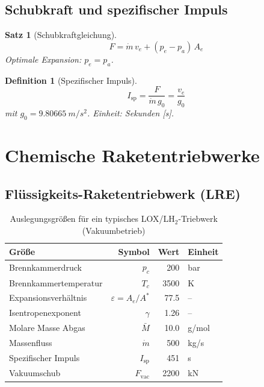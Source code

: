 ﻿\documentclass[12pt,a4paper]{article}
\newtheorem{satz}{Satz}[section]
\newtheorem{definition}{Definition}[section]
\newcommand{\Isp}{I_{\mathrm{sp}}}
\newcommand{\ve}{v_e}
\newcommand{\mdot}{\dot{m}}
\begin{document}
\subsection{Schubkraft und spezifischer Impuls}

\begin{satz}[Schubkraftgleichung]
\[
  \boxed{F = \mdot\,\ve + (p_e - p_a)\,A_e}
\]
Optimale Expansion: $p_e = p_a$.
\end{satz}

\begin{definition}[Spezifischer Impuls]
\[
  \boxed{\Isp = \frac{F}{\mdot\,g_0} = \frac{\ve}{g_0}}
\]
mit $g_0 = \SI{9.80665}{m/s^2}$. Einheit: Sekunden [s].
\end{definition}

\section{Chemische Raketentriebwerke}

\subsection{Flüssigkeits-Raketentriebwerk (LRE)}

\begin{table}[H]
\centering
\caption{Auslegungsgrößen für ein typisches LOX/LH$_2$-Triebwerk (Vakuum\-betrieb)}
\label{tab:triebwerk}
\begin{tabular}{lrrl}
\toprule
\textbf{Größe} & \textbf{Symbol} & \textbf{Wert} & \textbf{Einheit}\\
\midrule
Brennkammerdruck        & $p_c$     & 200        & bar\\
Brennkammertemperatur   & $T_c$     & 3500       & K\\
Expansionsverhältnis    & $\varepsilon = A_e/A^*$ & 77.5 & --\\
Isentropenexponent      & $\gamma$  & 1.26       & --\\
Molare Masse Abgas      & $\bar{M}$ & 10.0       & g/mol\\
Massenfluss             & $\mdot$   & 500        & kg/s\\
Spezifischer Impuls     & $\Isp$    & 451        & s\\
Vakuumschub             & $F_{\mathrm{vac}}$ & 2200 & kN\\
\bottomrule
\end{tabular}
\end{table}
\end{document}
